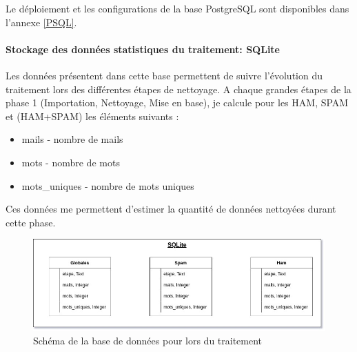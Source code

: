 \documentclass[a4paper,12pt]{article}
\begin{document}
				Le déploiement et les configurations de la base PostgreSQL sont disponibles dans l'annexe \ref{PSQL}.
			
			
			\paragraph{Stockage des données statistiques du traitement: SQLite}
				Les données présentent dans cette base permettent de suivre l'évolution du traitement lors des différentes étapes de nettoyage. 
				A chaque grandes étapes de la phase 1 (Importation, Nettoyage, Mise en base), je calcule pour les HAM, SPAM et (HAM+SPAM) les éléments suivants :
				\begin{itemize}
					\item mails - nombre de mails
					\item mots - nombre de mots 
					\item mots\_uniques - nombre de mots uniques
				\end{itemize}
				
				Ces données me permettent d'estimer la quantité de données nettoyées durant cette phase.
				
				\begin{figure}[H]
					\includegraphics[width=\linewidth]{img/Schemasqlite.jpg}
					\caption{Schéma de la base de données pour lors du traitement}
				\end{figure}
							
			
	
\end{document}
